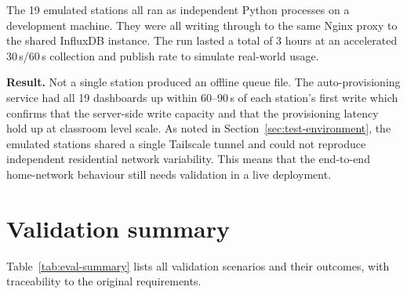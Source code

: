 The 19 emulated stations all ran as independent Python processes on a development machine. They were all writing through to the same Nginx proxy to the shared InfluxDB instance. The run lasted a total of 3 hours at an accelerated 30\,s/60\,s collection and publish rate to simulate real-world usage.

\textbf{Result.} Not a single station produced an offline queue file. The auto-provisioning service had all 19 dashboards up within 60--90\,s of each station's first write which confirms that the server-side write capacity and that the provisioning latency hold up at classroom level scale. As noted in Section~\ref{sec:test-environment}, the emulated stations shared a single Tailscale tunnel and could not reproduce independent residential network variability. This means that the end-to-end home-network behaviour still needs validation in a live deployment.

\section{Validation summary}
\label{sec:eval-summary}

Table~\ref{tab:eval-summary} lists all validation scenarios and their outcomes, with traceability to the original requirements.

